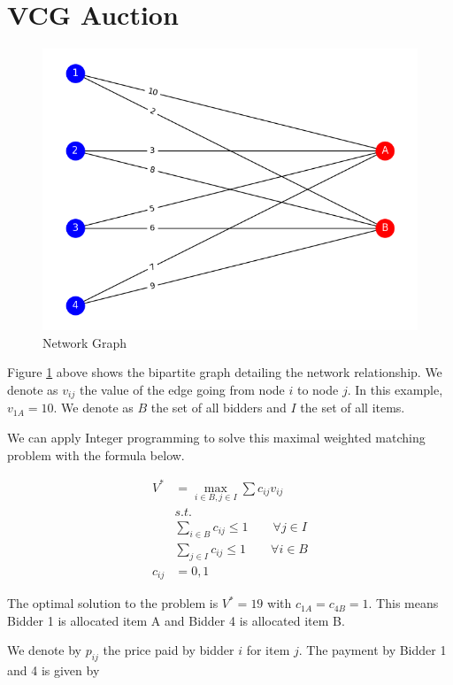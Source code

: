 \documentclass[]{article}
\begin{document}
\newpage
\section{VCG Auction}

\begin{figure}[H]
	\includegraphics[width=\linewidth]{Image-2.png}
	\caption{Network Graph} 
	\label{Q5.1 Network Graph}
\end{figure}

Figure \ref{Q5.1 Network Graph} above shows the bipartite graph detailing the network relationship. We denote as $v_{ij}$ the value of the edge going from node $i$ to node $j$. In this example, $v_{1A} = 10$. We denote as $B$ the set of all bidders and $I$ the set of all items.

We can apply Integer programming to solve this maximal weighted matching problem with the formula below.

\begin{align*}
	V^* &= \underset{i \in B, j \in I}{\max} \sum c_{ij}v_{ij}\\
	&s.t. \\
	&\sum_{i \in B} c_{ij} \leq 1 \qquad \forall j \in I \\
	&\sum_{j \in I} c_{ij} \leq 1 \qquad \forall i \in B \\
	c_{ij} &= {0, 1}
\end{align*}

The optimal solution to the problem is $V^* = 19$ with $c_{1A} = c_{4B} = 1$. This means Bidder 1 is allocated item A and Bidder 4 is allocated item B.

We denote by $p_{ij}$ the price paid by bidder $i$ for item $j$. The payment by Bidder 1 and 4 is given by
\end{document}

